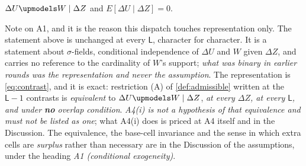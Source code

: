 %

\begin{assumption}\label{ass:condind}
$\Delta U \upmodels W \mid \Delta Z$ and $E[\Delta U \mid \Delta Z] = 0$.
\end{assumption}

\noindent Note on A1, and it is the reason this dispatch touches representation only. The
statement above is unchanged at every $\mathsf L$, character for character. It is a statement about
$\sigma$-fields, conditional independence of $\Delta U$ and $W$ given $\Delta Z$, and carries no
reference to the cardinality of $W$'s support; \emph{what was binary in earlier rounds was the
representation and never the assumption}. The representation is \eqref{eq:contrast}, and it is exact:
restriction (A) of \cref{def:admissible} written at the
$\mathsf L-1$ contrasts is \emph{equivalent} to $\Delta U\upmodels W\mid\Delta Z$, \emph{at every
$\Delta Z$, at every $\mathsf L$, and under \textbf{no} overlap condition}. \emph{A4(i) is not a
hypothesis of that equivalence and must not be listed as one}; what A4(i) does is priced at A4 itself
and in the Discussion. The equivalence, the
base-cell invariance and the sense in which
extra cells are \emph{surplus} rather than necessary are in the Discussion of the assumptions, under the
heading \emph{A1 (conditional exogeneity)}.

